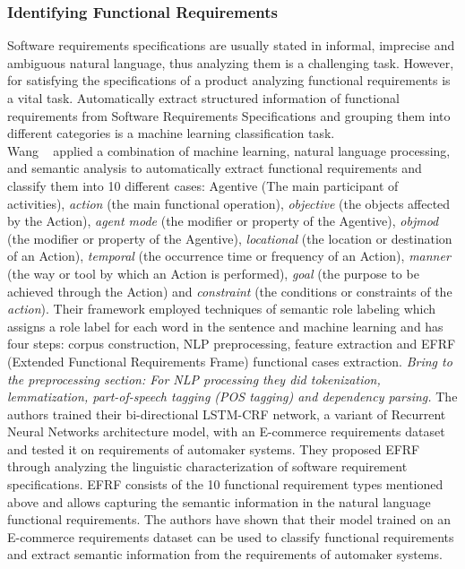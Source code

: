 \subsubsection{Identifying Functional Requirements}

Software requirements specifications are usually stated in informal, imprecise and ambiguous natural language, thus analyzing them is a challenging task. However, for satisfying the specifications of a product analyzing functional requirements is a vital task. Automatically extract structured information of functional requirements from Software Requirements Specifications and grouping them into different categories is a machine learning classification task\cite{7949577}. \\

Wang \etal~\cite{7949577} applied a combination of machine learning, natural
language processing, and semantic analysis to automatically extract functional
requirements and classify them into 10 different cases: Agentive (The main
participant of activities), \emph{action} (the main functional operation),
 \emph{objective} (the objects affected by the Action), \emph{agent mode} (the
 modifier or property of the Agentive), \emph{objmod} (the modifier or property
 of the Agentive), \emph{locational} (the location or
 destination of an Action), \emph{temporal} (the occurrence time or frequency of
 an Action), \emph{manner} (the way or tool by which an Action is performed),
 \emph{goal} (the purpose to be achieved through the Action) and
 \emph{constraint} (the conditions or constraints of the  \emph{action}). Their
 framework employed techniques of semantic role labeling which assigns a 
role  label  for  each  word  in  the  sentence and
 machine learning and has four steps: corpus construction, NLP
 preprocessing, feature extraction and EFRF (Extended Functional Requirements
 Frame) functional cases extraction.
 \emph{Bring to the preprocessing section: For NLP processing they did
 tokenization, lemmatization, part-of-speech tagging (POS tagging) and
 dependency parsing.} The authors trained their bi-directional LSTM-CRF network,
 a variant of Recurrent Neural Networks architecture model, with an E-commerce
 requirements dataset and tested it on requirements of automaker systems. They
 proposed EFRF through analyzing the linguistic characterization of
 software requirement specifications. EFRF consists of the 10 functional requirement types mentioned
 above and allows capturing the semantic information in the natural language
 functional requirements. The authors have shown that their
 model trained on an E-commerce requirements dataset can be used to classify functional requirements and extract
 semantic information from the requirements of automaker systems.

